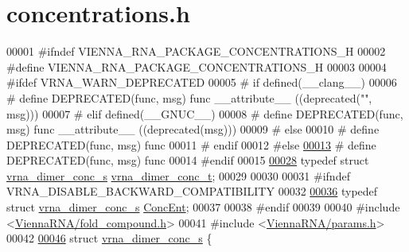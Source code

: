 \hypertarget{concentrations_8h_source}{}\section{concentrations.\+h}
\label{concentrations_8h_source}

\begin{DoxyCode}
00001 \textcolor{preprocessor}{#ifndef VIENNA\_RNA\_PACKAGE\_CONCENTRATIONS\_H}
00002 \textcolor{preprocessor}{#define VIENNA\_RNA\_PACKAGE\_CONCENTRATIONS\_H}
00003 
00004 \textcolor{preprocessor}{#ifdef VRNA\_WARN\_DEPRECATED}
00005 \textcolor{preprocessor}{# if defined(\_\_clang\_\_)}
00006 \textcolor{preprocessor}{#  define DEPRECATED(func, msg) func \_\_attribute\_\_ ((deprecated("", msg)))}
00007 \textcolor{preprocessor}{# elif defined(\_\_GNUC\_\_)}
00008 \textcolor{preprocessor}{#  define DEPRECATED(func, msg) func \_\_attribute\_\_ ((deprecated(msg)))}
00009 \textcolor{preprocessor}{# else}
00010 \textcolor{preprocessor}{#  define DEPRECATED(func, msg) func}
00011 \textcolor{preprocessor}{# endif}
00012 \textcolor{preprocessor}{#else}
\mbox{\hyperlink{concentrations_8h_aab347a3c03fbe8e7319551b9fa0cce4a}{00013}} \textcolor{preprocessor}{# define DEPRECATED(func, msg) func}
00014 \textcolor{preprocessor}{#endif}
00015 
\mbox{\hyperlink{group__pf__cofold_gac48c2723444ecfdceafcfd525ca98322}{00028}} \textcolor{keyword}{typedef} \textcolor{keyword}{struct }\mbox{\hyperlink{structvrna__dimer__conc__s}{vrna\_dimer\_conc\_s}} \mbox{\hyperlink{structvrna__dimer__conc__s}{vrna\_dimer\_conc\_t}};
00029 
00030 
00031 \textcolor{preprocessor}{#ifndef VRNA\_DISABLE\_BACKWARD\_COMPATIBILITY}
00032 
\mbox{\hyperlink{group__pf__cofold_ga46244c7adf5040580291c45b465f4efa}{00036}} \textcolor{keyword}{typedef} \textcolor{keyword}{struct }\mbox{\hyperlink{structvrna__dimer__conc__s}{vrna\_dimer\_conc\_s}} \mbox{\hyperlink{structvrna__dimer__conc__s}{ConcEnt}};
00037 
00038 \textcolor{preprocessor}{#endif}
00039 
00040 \textcolor{preprocessor}{#include <\mbox{\hyperlink{fold__compound_8h}{ViennaRNA/fold\_compound.h}}>}
00041 \textcolor{preprocessor}{#include <\mbox{\hyperlink{params_8h}{ViennaRNA/params.h}}>}
00042 
\mbox{\hyperlink{structvrna__dimer__conc__s}{00046}} \textcolor{keyword}{struct }\mbox{\hyperlink{structvrna__dimer__conc__s}{vrna\_dimer\_conc\_s}} \{

\end{DoxyCode}
